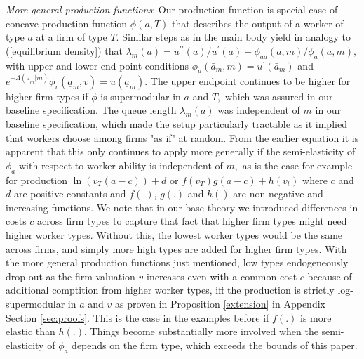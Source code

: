 \documentclass[12pt]{article}
\theoremstyle{plain}
\begin{document}
\bigskip

\textit{More general production functions}: Our production function is
special case of concave production function $\phi (a,T)$ that describes the
output of a worker of type $a$ at a firm of type $T.$ Similar steps as in
the main body yield in analogy to (\ref{equilibrium density}) that $\lambda
_{m}(a)=u^{\prime \prime }(a)/u^{\prime }(a)-\phi _{aa}(a,m)/\phi _{a}(a,m),$
with upper and lower end-point conditions $\phi _{a}(\bar{a}%
_{m},m)=u^{\prime }(\bar{a}_{m})$ and $e^{-\Lambda (\underline{a}%
_{m}|m)}\phi _{v}(\underline{a}_{m},v)=u(\underline{a}_{m}).$ The upper
endpoint continues to be higher for higher firm types if $\phi $ is
supermodular in $a$ and $T,$ which was assured in our baseline
specification. The queue length $\lambda _{m}(a)$ was independent of $m$ in
our baseline specification, which made the setup particularly tractable as
it implied that workers choose among firms "as if" at random. From the
earlier equation it is apparent that this only continues to apply more
generally if the semi-elasticity of $\phi _{a}$ with respect to worker
ability is independent of $m,$ as is the case for example for production $%
\ln (v_{T}(a-c))+d$ or $f(v_{T})g(a-c)+h(v_{t})$ where $c$ and $d$ are
positive constants and $f(.)$, $g(.)$ and $h()$ are non-negative and
increasing functions. We note that in our base theory we introduced
differences in costs $c$ across firm types to capture that fact that higher
firm types might need higher worker types. Without this, the lowest worker
types would be the same across firms, and simply more high types are added
for higher firm types. With the more general production functions just
mentioned, low types endogeneously drop out as the firm valuation $v$
increases even with a common cost $c$ because of additional comptition from
higher worker types, iff the production is strictly log-supermodular in $a$
and $v$ as proven in Proposition \ref{extension} in Appendix Section \ref{sec:proofs}. This is
the case in the examples before if $f(.)$ is more elastic than $h(.).$
Things become substantially more involved when the semi-elasticity of $\phi
_{a}$ depends on the firm type, which exceeds the bounds of this paper.
\end{document}
